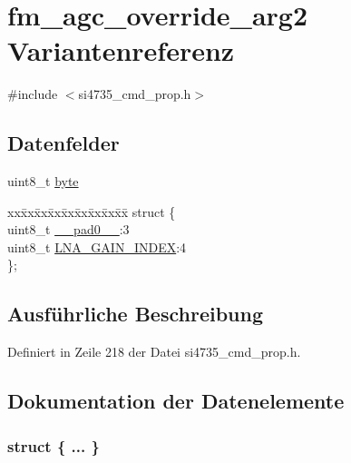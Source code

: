 \hypertarget{unionfm__agc__override__arg2}{}\section{fm\+\_\+agc\+\_\+override\+\_\+arg2 Variantenreferenz}
\label{unionfm__agc__override__arg2}


{\ttfamily \#include $<$si4735\+\_\+cmd\+\_\+prop.\+h$>$}

\subsection*{Datenfelder}
\begin{DoxyCompactItemize}
\item 
uint8\+\_\+t \hyperlink{unionfm__agc__override__arg2_a96f44d20f1dbf1c8785a7bc99a46164c}{byte}
\item 
\begin{tabbing}
xx\=xx\=xx\=xx\=xx\=xx\=xx\=xx\=xx\=\kill
struct \{\\
\>uint8\_t \hyperlink{unionfm__agc__override__arg2_a8b4eebe79ded0459acec2f4950102ba3}{\_\_pad0\_\_}:3\\
\>uint8\_t \hyperlink{unionfm__agc__override__arg2_a0a84cd6abd9c04a7912cb54a2a3949df}{LNA\_GAIN\_INDEX}:4\\
\}; \\

\end{tabbing}\end{DoxyCompactItemize}


\subsection{Ausführliche Beschreibung}


Definiert in Zeile 218 der Datei si4735\+\_\+cmd\+\_\+prop.\+h.



\subsection{Dokumentation der Datenelemente}
\hypertarget{unionfm__agc__override__arg2_a8465a37c4a1779d757c6dd17a75859d0}{}\subsubsection[{"@35}]{\setlength{\rightskip}{0pt plus 5cm}struct \{ ... \} }\label{unionfm__agc__override__arg2_a8465a37c4a1779d757c6dd17a75859d0}
\hypertarget{unionfm__agc__override__arg2_a8b4eebe79ded0459acec2f4950102ba3}{}
